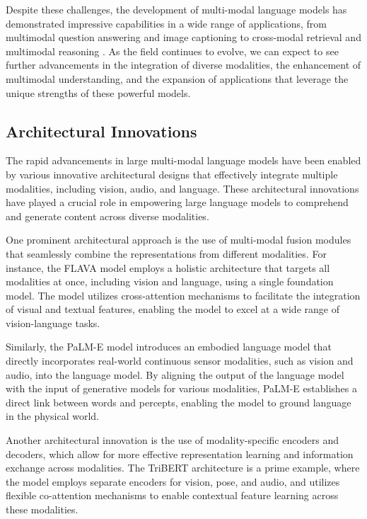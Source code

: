\documentclass[11pt]{article}
\begin{document}
Despite these challenges, the development of multi-modal language models has demonstrated impressive capabilities in a wide range of applications, from multimodal question answering and image captioning to cross-modal retrieval and multimodal reasoning \cite{ref26,ref27}. As the field continues to evolve, we can expect to see further advancements in the integration of diverse modalities, the enhancement of multimodal understanding, and the expansion of applications that leverage the unique strengths of these powerful models.

\subsection{Architectural Innovations}

The rapid advancements in large multi-modal language models have been enabled by various innovative architectural designs that effectively integrate multiple modalities, including vision, audio, and language. These architectural innovations have played a crucial role in empowering large language models to comprehend and generate content across diverse modalities.

One prominent architectural approach is the use of multi-modal fusion modules that seamlessly combine the representations from different modalities. For instance, the FLAVA model \cite{ref27} employs a holistic architecture that targets all modalities at once, including vision and language, using a single foundation model. The model utilizes cross-attention mechanisms to facilitate the integration of visual and textual features, enabling the model to excel at a wide range of vision-language tasks.

Similarly, the PaLM-E model \cite{ref6} introduces an embodied language model that directly incorporates real-world continuous sensor modalities, such as vision and audio, into the language model. By aligning the output of the language model with the input of generative models for various modalities, PaLM-E establishes a direct link between words and percepts, enabling the model to ground language in the physical world.

Another architectural innovation is the use of modality-specific encoders and decoders, which allow for more effective representation learning and information exchange across modalities. The TriBERT architecture \cite{ref28} is a prime example, where the model employs separate encoders for vision, pose, and audio, and utilizes flexible co-attention mechanisms to enable contextual feature learning across these modalities.
\end{document}

